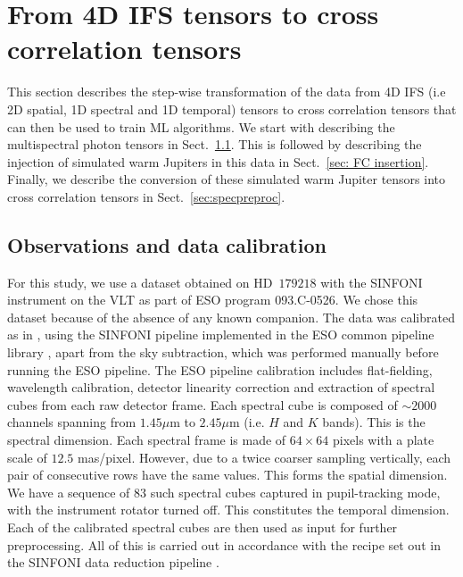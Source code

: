 \documentclass{aa}
\begin{document}

\section{From 4D IFS tensors to cross correlation tensors}\label{sec:data}

This section describes the step-wise transformation of the data from 4D IFS (i.e 2D spatial, 1D spectral and 1D temporal) tensors to cross correlation tensors that can then be used to train ML algorithms.
We start with describing the multispectral photon tensors in Sect.~\ref{sec:datadesc}.
This is followed by describing the injection of simulated warm Jupiters in this data in Sect.~\ref{sec: FC insertion}.
Finally, we describe the conversion of these simulated warm Jupiter tensors into cross correlation tensors in Sect.~\ref{sec:specpreproc}.

\subsection{Observations and data calibration}\label{sec:datadesc}

For this study, we use a dataset obtained on HD~$179218$ with the SINFONI instrument on the VLT \citep{2004SINFONI,2003SEisenhauer} as part of ESO program 093.C-0526.
We chose this dataset because of the absence of any known companion.
The data was calibrated as in \citet{2018A&ChristiaensHD142527}, using the SINFONI pipeline implemented in the ESO common pipeline library \citep[EsoRex version 3.10.2;][]{2006Abuter}, apart from the sky subtraction, which was performed manually before running the ESO pipeline.
The ESO pipeline calibration includes flat-fielding, wavelength calibration, detector linearity correction and extraction of spectral cubes from each raw detector frame. 
Each spectral cube is composed of $\sim 2000$ channels spanning from $1.45\mu$m to $2.45 \mu$m (i.e. $H$ and $K$ bands).
This is the spectral dimension.
Each spectral frame is made of $64\times64$ pixels with a plate scale of $12.5$ mas/pixel. However, due to a twice coarser sampling vertically, each pair of consecutive rows have the same values.
This forms the spatial dimension.
We have a sequence of $83$ such spectral cubes captured in pupil-tracking mode, with the instrument rotator turned off.
This constitutes the temporal dimension.
Each of the calibrated spectral cubes are then used as input for further preprocessing.
All of this is carried out in accordance with the recipe set out in the SINFONI data reduction pipeline \citep{2006Abuter}.
\end{document}
